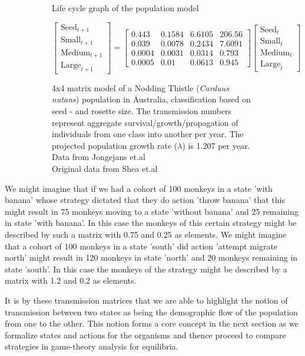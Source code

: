 \begin{figure}[h]
\begin{subfigure}[b]{.5\linewidth}
        \caption{Life cycle graph of the population model}\label{fig:1a}
    \end{subfigure}
    \begin{subfigure}[b]{.5\linewidth}
        \centering
        \footnotesize
        $$ \begin{bmatrix}\text{Seed}_{t+1}\\\text{Small}_{t+1}\\\text{Medium}_{t+1}\\\text{Large}_{t+1}\end{bmatrix}= 
        \begin{bmatrix}
            0.443&0.1584&6.6105&206.56\\
            0.039&0.0078&0.2434&7.6091\\
            0.0004&0.0031&0.0314&0.793\\
            0.0005&0.01&0.0613&0.945
        \end{bmatrix}
        \begin{bmatrix}\text{Seed}_{t}\\\text{Small}_{t}\\\text{Medium}_{t}\\\text{Large}_{t}\end{bmatrix}$$
        \caption{
            4x4 matrix model of a Nodding Thistle (\textit{Carduus nutans}) population in Australia, classification based on seed - and rosette size. The transmission numbers represent aggregate survival/growth/propagation of individuals from one class into another per year. The projected population growth rate ($\lambda$) is 1.207 per year.\\
      Data from Jongejans et.al\cite{models2}\\ Original data from Shea et.al\cite{models3}
        }\label{fig:1b}
    \end{subfigure}
        \vspace{-2.3\baselineskip}
    \caption{}\label{fig:1}
\end{figure}

We might imagine that if we had a cohort of 100 monkeys in a state 'with banana' whose strategy dictated that they do action 'throw banana' that this might result in 75 monkeys moving to a state 'without banana' and 25 remaining in state 'with banana'. In this case the monkeys of this certain strategy might be described by such a matrix with 0.75 and 0.25 as elements.
We might imagine that a cohort of 100 monkeys in a state 'south' did action 'attempt migrate north' might result in 120 monkeys in state 'north' and 20 monkeys remaining in state 'south'. In this case the monkeys of the strategy might be described by a matrix with 1.2 and 0.2 as elements.

It is by these transmission matrices that we are able to highlight the notion of transmission between two states as being the demographic flow of the population from one to the other.
This notion forms a core concept in the next section as we formalize states and actions for the organisms and thence proceed to compare strategies in game-theory analysis for equilibria.

